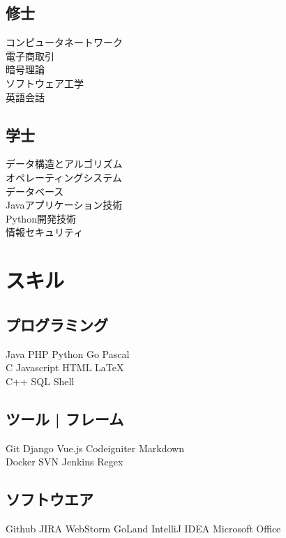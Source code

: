 \documentclass[]{deedy-resume-openfont}
\begin{document}
\begin{minipage}[t]{0.25\textwidth}
\subsection{修士}
コンピュータネートワーク \\
電子商取引 \\
暗号理論 \\
ソフトウェア工学 \\
英語会話 \\ 
\sectionsep

\subsection{学士}
データ構造とアルゴリズム \\
オペレーティングシステム \\ 
データベース \\
Javaアプリケーション技術 \\
Python開発技術 \\
情報セキュリティ \\
\sectionsep

\section{スキル}
\subsection{プログラミング}
Java \textbullet{} PHP \textbullet{} Python \textbullet{} Go \textbullet{} Pascal\\
C \textbullet{} Javascript \textbullet{} HTML \textbullet{} \LaTeX\ \\
C++ \textbullet{} SQL \textbullet{} Shell \\ 
\sectionsep

\subsection{ツール | フレーム}
Git \textbullet{} Django \textbullet{} Vue.js \textbullet{} Codeigniter \textbullet{} Markdown \\
Docker  \textbullet{} SVN \textbullet{} Jenkins \textbullet{} Regex\\
\sectionsep

\subsection{ソフトウエア}
Github \textbullet{} JIRA \textbullet{} WebStorm \textbullet{} GoLand \textbullet{} IntelliJ IDEA \textbullet{} Microsoft Office

%
%

\end{minipage} 
\end{document}
